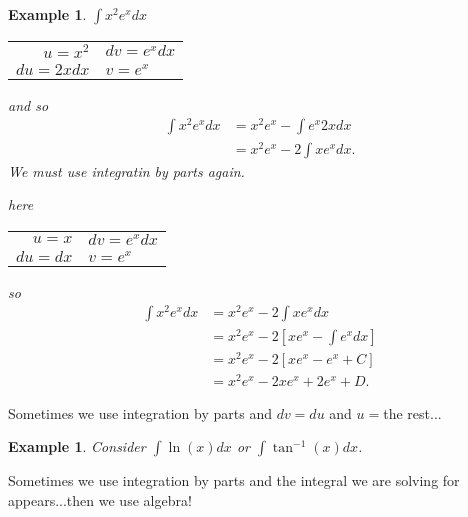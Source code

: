 \documentclass[reqno]{amsart}
\newtheorem{eg}[lem]{Example}
\numberwithin{equation}{section}
\begin{document}
\begin{eg} $\int x^2 e^x dx$

\begin{center}
  \begin{tabular}{ r||l}
    $u=x^2$ & $dv=e^x dx$ \\ 
    $du=2xdx$ & $v=e^x$\\ 
  \end{tabular}
\end{center}


and so 
\begin{align*} \int  x^2 e^x dx &= x^2 e^x - \int e^x 2x dx \\
&= x^2 e^x - 2\int xe^x  dx. 
\end{align*}
We must use integratin by parts again.

here\\
\begin{center}
  \begin{tabular}{ r||l}
    $u=x$ & $dv=e^x dx$ \\ 
    $du=dx$ & $v=e^x$\\ 
  \end{tabular}
\end{center}

so 
\begin{align*} \int  x^2 e^x dx &= x^2 e^x - 2\int xe^x  dx \\
&=  x^2 e^x - 2 \left[xe^x - \int e^x dx \right] \\
&=  x^2 e^x - 2 \left[xe^x - e^x +C \right] \\
&= x^2 e^x - 2x e^x +2e^x +D.
\end{align*}
\end{eg}

Sometimes we use integration by parts and $dv=du$ and $u=$the rest...

\begin{eg} Consider $\int \ln(x) dx$ or $\int \tan^{-1}(x)dx$.
\end{eg}

Sometimes we use integration by parts and the integral we are solving for appears...then we use algebra!
\end{document}
